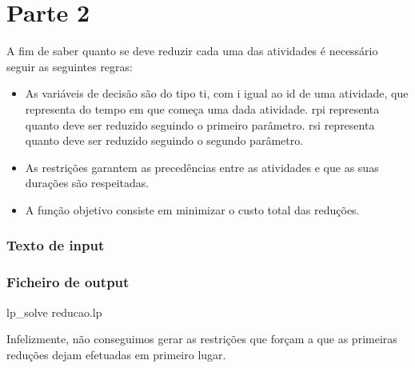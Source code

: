\documentclass[a4paper]{report}
\begin{document}
\chapter{Parte 2}
A fim de saber quanto se deve reduzir cada uma das atividades é necessário
seguir as seguintes regras:
\begin{itemize}
    \item As variáveis de decisão são do tipo ti, com i igual ao id de uma
        atividade, que representa do tempo em que começa uma dada atividade.
        rpi representa quanto deve ser reduzido seguindo o primeiro parâmetro.
        rsi representa quanto deve ser reduzido seguindo o segundo parâmetro.
    \item As restrições garantem as precedências entre as atividades e que as
        suas durações são respeitadas.
    \item A função objetivo consiste em  minimizar o custo total das reduções.
\end{itemize}

\pagebreak
\subsection{Texto de input}


\pagebreak
\subsection{Ficheiro de output}
\bash[stdout]
lp_solve reducao.lp
\END

Infelizmente, não conseguimos gerar as restrições que forçam a que as primeiras
reduções dejam efetuadas em primeiro lugar.
\end{document}
